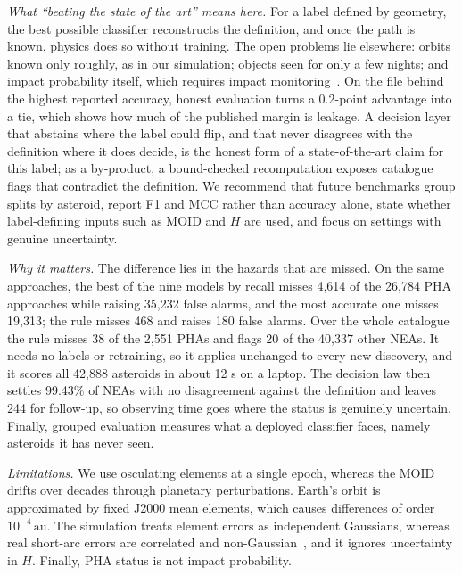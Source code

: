 \documentclass[make,article,submit,moreauthors]{Definitions/mdpi}
\newcommand{\au}{\,\mathrm{au}}
\begin{document}
\emph{What ``beating the state of the art'' means here.} For a label defined by geometry, the best possible classifier reconstructs the definition, and once the path is known, physics does so without training. The open problems lie elsewhere: orbits known only roughly, as in our simulation; objects seen for only a few nights; and impact probability itself, which requires impact monitoring~\cite{milani2005,roa2021}. On the file behind the highest reported accuracy, honest evaluation turns a 0.2-point advantage into a tie, which shows how much of the published margin is leakage. A decision layer that abstains where the label could flip, and that never disagrees with the definition where it does decide, is the honest form of a state-of-the-art claim for this label; as a by-product, a bound-checked recomputation exposes catalogue flags that contradict the definition. We recommend that future benchmarks group splits by asteroid, report F1 and MCC rather than accuracy alone, state whether label-defining inputs such as MOID and $H$ are used, and focus on settings with genuine uncertainty.

\emph{Why it matters.} The difference lies in the hazards that are missed. On the same approaches, the best of the nine models by recall misses 4,614 of the 26,784 PHA approaches while raising 35,232 false alarms, and the most accurate one misses 19,313; the rule misses 468 and raises 180 false alarms. Over the whole catalogue the rule misses 38 of the 2,551 PHAs and flags 20 of the 40,337 other NEAs. It needs no labels or retraining, so it applies unchanged to every new discovery, and it scores all 42,888 asteroids in about 12 s on a laptop. The decision law then settles 99.43\% of NEAs with no disagreement against the definition and leaves 244 for follow-up, so observing time goes where the status is genuinely uncertain. Finally, grouped evaluation measures what a deployed classifier faces, namely asteroids it has never seen.

\emph{Limitations.} We use osculating elements at a single epoch, whereas the MOID drifts over decades through planetary perturbations. Earth's orbit is approximated by fixed J2000 mean elements, which causes differences of order $10^{-4}\au$. The simulation treats element errors as independent Gaussians, whereas real short-arc errors are correlated and non-Gaussian~\cite{milani_gronchi2009}, and it ignores uncertainty in $H$. Finally, PHA status is not impact probability.
\end{document}
